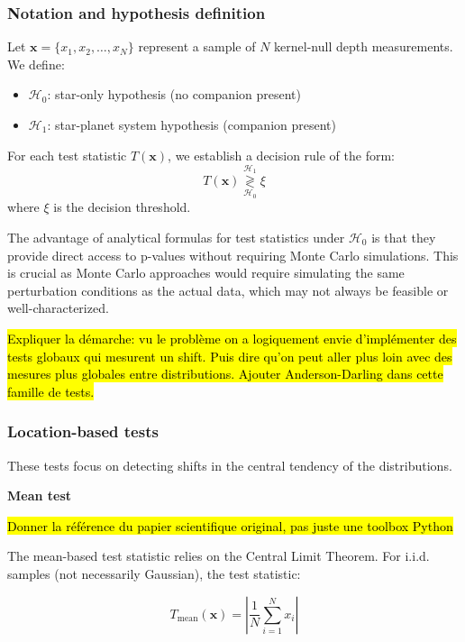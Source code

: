 \documentclass{article}
\begin{document}
\subsubsection{Notation and hypothesis definition}

Let $\mathbf{x} = \{x_1, x_2, \ldots, x_N\}$ represent a sample of $N$ kernel-null depth measurements. We define:
\begin{itemize}
    \item ${\mathcal{H}}_0$: star-only hypothesis (no companion present)
    \item ${\mathcal{H}}_1$: star-planet system hypothesis (companion present)
\end{itemize}

For each test statistic $T(\mathbf{x})$, we establish a decision rule of the form:
\begin{equation}
T(\mathbf{x}) \stackrel{{\mathcal{H}}_1}{\underset{{\mathcal{H}}_0}{\gtrless}} \xi
\end{equation}
where $\xi$ is the decision threshold.

The advantage of analytical formulas for test statistics under ${\mathcal{H}}_0$ is that they provide direct access to p-values without requiring Monte Carlo simulations. This is crucial as Monte Carlo approaches would require simulating the same perturbation conditions as the actual data, which may not always be feasible or well-characterized.

\hl{Expliquer la démarche: vu le problème on a logiquement envie d'implémenter des tests globaux qui mesurent un shift. Puis dire qu'on peut aller plus loin avec des mesures plus globales entre distributions. Ajouter Anderson-Darling dans cette famille de tests.}

\subsubsection{Location-based tests}

These tests focus on detecting shifts in the central tendency of the distributions.

\textbf{Mean test}

\hl{Donner la référence du papier scientifique original, pas juste une toolbox Python}

The mean-based test statistic relies on the Central Limit Theorem. For i.i.d. samples (not necessarily Gaussian), the test statistic:

\begin{equation}
T_{\text{mean}}(\mathbf{x}) = \left|\frac{1}{N}\sum_{i=1}^N x_i \right|
\end{equation}
\end{document}

